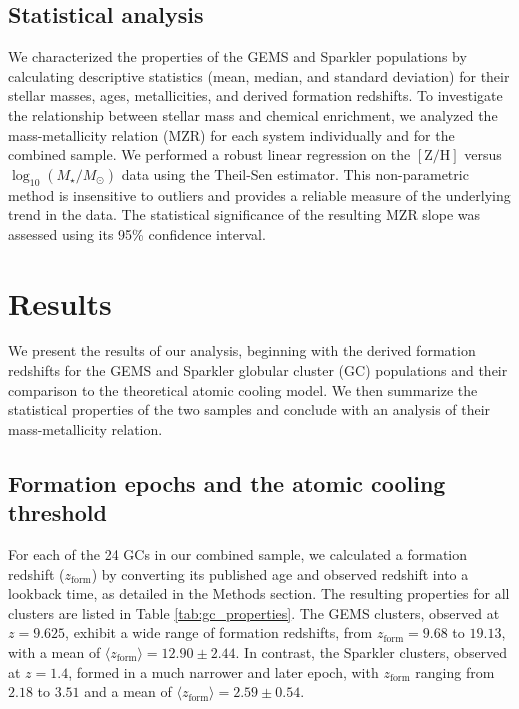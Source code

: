 \documentclass[]{article}
\begin{document}
\subsection{Statistical analysis}
We characterized the properties of the GEMS and Sparkler populations by calculating descriptive statistics (mean, median, and standard deviation) for their stellar masses, ages, metallicities, and derived formation redshifts. To investigate the relationship between stellar mass and chemical enrichment, we analyzed the mass-metallicity relation (MZR) for each system individually and for the combined sample. We performed a robust linear regression on the $[\mathrm{Z/H}]$ versus $\log_{10}(M_\star/M_\odot)$ data using the Theil-Sen estimator. This non-parametric method is insensitive to outliers and provides a reliable measure of the underlying trend in the data. The statistical significance of the resulting MZR slope was assessed using its 95\% confidence interval.

\section{Results}
\label{sec:results}
We present the results of our analysis, beginning with the derived formation redshifts for the GEMS and Sparkler globular cluster (GC) populations and their comparison to the theoretical atomic cooling model. We then summarize the statistical properties of the two samples and conclude with an analysis of their mass-metallicity relation.

\subsection{Formation epochs and the atomic cooling threshold}

For each of the 24 GCs in our combined sample, we calculated a formation redshift ($z_\mathrm{form}$) by converting its published age and observed redshift into a lookback time, as detailed in the Methods section. The resulting properties for all clusters are listed in Table \ref{tab:gc_properties}. The GEMS clusters, observed at $z=9.625$, exhibit a wide range of formation redshifts, from $z_\mathrm{form} = 9.68$ to $19.13$, with a mean of $\langle z_\mathrm{form} \rangle = 12.90 \pm 2.44$. In contrast, the Sparkler clusters, observed at $z=1.4$, formed in a much narrower and later epoch, with $z_\mathrm{form}$ ranging from $2.18$ to $3.51$ and a mean of $\langle z_\mathrm{form} \rangle = 2.59 \pm 0.54$.
\end{document}
